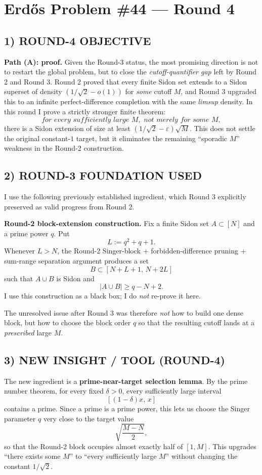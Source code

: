 \section{Erd\H{o}s Problem \#44 --- Round 4}

\subsection*{1) ROUND-4 OBJECTIVE}
\textbf{Path (A): proof.}
Given the Round-3 status, the most promising direction is not to restart the global problem, but to close the \emph{cutoff-quantifier gap} left by Round 2 and Round 3.  Round 2 proved that every finite Sidon set extends to a Sidon superset of density $(1/\sqrt2-o(1))$ for \emph{some} cutoff $M$, and Round 3 upgraded this to an infinite perfect-difference completion with the same \emph{limsup} density.  In this round I prove a strictly stronger finite theorem:
\[
\textit{for every sufficiently large } M, \textit{ not merely for some } M,
\]
there is a Sidon extension of size at least $(1/\sqrt2-\varepsilon)\sqrt M$.
This does not settle the original constant-$1$ target, but it eliminates the remaining ``sporadic $M$'' weakness in the Round-2 construction.

\subsection*{2) ROUND-3 FOUNDATION USED}
I use the following previously established ingredient, which Round 3 explicitly preserved as valid progress from Round 2.

\medskip
\noindent
\textbf{Round-2 block-extension construction.}
Fix a finite Sidon set $A\subset [N]$ and a prime power $q$.  Put
\[
L:=q^2+q+1.
\]
Whenever $L>N$, the Round-2 Singer-block + forbidden-difference pruning + sum-range separation argument produces a set
\[
B\subset [N+L+1,\,N+2L]
\]
such that $A\cup B$ is Sidon and
\[
|A\cup B|\ge q-N+2.
\]
I use this construction as a black box; I do \emph{not} re-prove it here.

\medskip
\noindent
The unresolved issue after Round 3 was therefore \emph{not} how to build one dense block, but how to choose the block order $q$ so that the resulting cutoff lands at a \emph{prescribed} large $M$.

\subsection*{3) NEW INSIGHT / TOOL (ROUND-4)}
The new ingredient is a \textbf{prime-near-target selection lemma}.  By the prime number theorem, for every fixed $\delta>0$, every sufficiently large interval
\[
[(1-\delta)x,\,x]
\]
contains a prime.  Since a prime is a prime power, this lets us choose the Singer parameter $q$ very close to the target value
\[
\sqrt{\frac{M-N}{2}},
\]
so that the Round-2 block occupies almost exactly half of $[1,M]$.  This upgrades ``there exists some $M$'' to ``every sufficiently large $M$'' without changing the constant $1/\sqrt2$.

